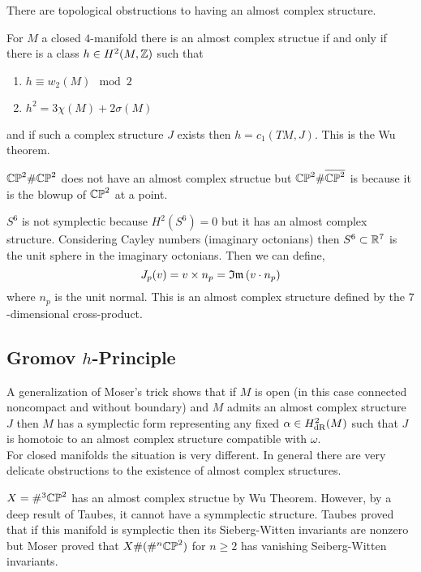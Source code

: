 \documentclass[12pt]{article}
\begin{document}
There are topological obstructions to having an almost complex structure. 

\begin{example}
For $M$ a closed $4$-manifold there is an almost complex structue if and only if there is a class $h \in H^2(M, \mathbb{Z})$ such that
\begin{enumerate}
\item $h \equiv w_2(M) \mod 2$
\item $h^2 = 3 \chi(M) + 2 \sigma(M)$
\end{enumerate}
and if such a complex structure $J$ exists then $h = c_1(TM, J)$. This is the Wu theorem.
\end{example}

\begin{example}
$\mathbb{CP}^2 \# \mathbb{CP}^2$ does not have an almost complex structue but $\mathbb{CP}^2 \# \overline{\mathbb{CP}^2}$ is \kahler because it is the blowup of $\mathbb{CP}^2$ at a point. 
\end{example}

\begin{example}
$S^6$ is not symplectic because $H^2(S^6) = 0$ but it has an almost complex structure. Considering Cayley numbers (imaginary octonians) then $S^6 \subset \mathbb{R}^7$ is the unit sphere in the imaginary octonians. Then we can define,
\[ J_p(v) = v \times n_p = \mathfrak{Im}\left( v \cdot n_p \right) \]
where $n_p$ is the unit normal. This is an almost complex structure defined by the $7$-dimensional cross-product. 
\end{example}

\subsection{Gromov $h$-Principle}

A generalization of Moser's trick shows that if $M$ is open (in this case connected noncompact and without boundary) and $M$ admits an almost complex structure $J$ then $M$ has a symplectic form representing any fixed $\alpha \in H^2_{\mathrm{dR}}(M)$ such that $J$ is homotoic to an almost complex structure compatible with $\omega$. 
\bigskip\\
For closed manifolds the situation is very different. In general there are very delicate obstructions to the existence of almost complex structures. 

\begin{example}
$X = \#^3 \mathbb{CP}^2$ has an almost complex structue by Wu Theorem. However, by a deep result of Taubes, it cannot have a symmplectic structure. Taubes proved that if this manifold is symplectic then its Sieberg-Witten invariants are nonzero but Moser proved that $X \# (\#^n \mathbb{CP}^2)$ for $n \ge 2$ has vanishing Seiberg-Witten invariants.
\end{example}
\end{document}
